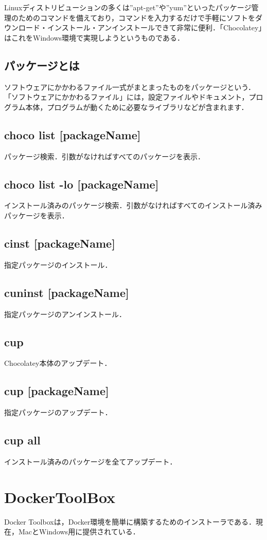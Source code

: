 Linuxディストリビューションの多くは”apt-get”や”yum”といったパッケージ管理のためのコマンドを備えており，コマンドを入力するだけで手軽にソフトをダウンロード・インストール・アンインストールできて非常に便利．「Chocolatey」はこれをWindows環境で実現しようというものである．



\subsection{パッケージとは}
ソフトウェアにかかわるファイル一式がまとまったものをパッケージという．「ソフトウェアにかかわるファイル」には，設定ファイルやドキュメント，プログラム本体，プログラムが動くために必要なライブラリなどが含まれます．

\subsection{choco list [packageName]}
 パッケージ検索．引数がなければすべてのパッケージを表示．
\subsection{choco list -lo [packageName] }
インストール済みのパッケージ検索．引数がなければすべてのインストール済みパッケージを表示．
\subsection{cinst [packageName]}
 指定パッケージのインストール．
\subsection{cuninst [packageName]}
 指定パッケージのアンインストール．
\subsection{cup}
 Chocolatey本体のアップデート．
\subsection{cup [packageName]}
 指定パッケージのアップデート．
\subsection{cup all}
 インストール済みのパッケージを全てアップデート．

\newpage
\section{DockerToolBox}
Docker Toolboxは，Docker環境を簡単に構築するためのインストーラである．現在，MacとWindows用に提供されている．

